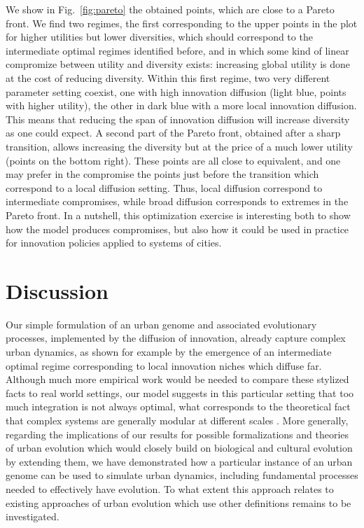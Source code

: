 \documentclass[letterpaper]{article}
\begin{document}
We show in Fig.~\ref{fig:pareto} the obtained points, which are close to a Pareto front. We find two regimes, the first corresponding to the upper points in the plot for higher utilities but lower diversities, which should correspond to the intermediate optimal regimes identified before, and in which some kind of linear compromize between utility and diversity exists: increasing global utility is done at the cost of reducing diversity. Within this first regime, two very different parameter setting coexist, one with high innovation diffusion (light blue, points with higher utility), the other in dark blue with a more local innovation diffusion. This means that reducing the span of innovation diffusion will increase diversity as one could expect. A second part of the Pareto front, obtained after a sharp transition, allows increasing the diversity but at the price of a much lower utility (points on the bottom right). These points are all close to equivalent, and one may prefer in the compromise the points just before the transition which correspond to a local diffusion setting. Thus, local diffusion correspond to intermediate compromises, while broad diffusion corresponds to extremes in the Pareto front. In a nutshell, this optimization exercise is interesting both to show how the model produces compromises, but also how it could be used in practice for innovation policies applied to systems of cities.



\section{Discussion}

Our simple formulation of an urban genome and associated evolutionary processes, implemented by the diffusion of innovation, already capture complex urban dynamics, as shown for example by the emergence of an intermediate optimal regime corresponding to local innovation niches which diffuse far. Although much more empirical work would be needed to compare these stylized facts to real world settings, our model suggests in this particular setting that too much integration is not always optimal, what corresponds to the theoretical fact that complex systems are generally modular at different scales \citep{ethiraj2004modularity}. More generally, regarding the implications of our results for possible formalizations and theories of urban evolution which would closely build on biological and cultural evolution by extending them, we have demonstrated how a particular instance of an urban genome can be used to simulate urban dynamics, including fundamental processes needed to effectively have evolution. To what extent this approach relates to existing approaches of urban evolution which use other definitions remains to be investigated.
\end{document}
